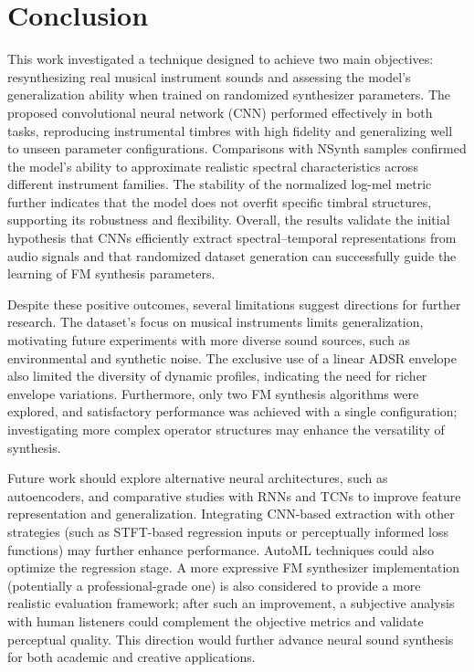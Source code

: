 \documentclass[10pt,conference]{IEEEtran}
\begin{document}
\section{Conclusion} \label{sec:conclusion}

This work investigated a technique designed to achieve two main objectives: resynthesizing real musical instrument sounds and assessing the model's generalization ability when trained on randomized synthesizer parameters. The proposed convolutional neural network (CNN) performed effectively in both tasks, reproducing instrumental timbres with high fidelity and generalizing well to unseen parameter configurations. Comparisons with NSynth samples confirmed the model’s ability to approximate realistic spectral characteristics across different instrument families. The stability of the normalized log-mel metric further indicates that the model does not overfit specific timbral structures, supporting its robustness and flexibility. Overall, the results validate the initial hypothesis that CNNs efficiently extract spectral–temporal representations from audio signals and that randomized dataset generation can successfully guide the learning of FM synthesis parameters.

Despite these positive outcomes, several limitations suggest directions for further research. The dataset’s focus on musical instruments limits generalization, motivating future experiments with more diverse sound sources, such as environmental and synthetic noise. The exclusive use of a linear ADSR envelope also limited the diversity of dynamic profiles, indicating the need for richer envelope variations. Furthermore, only two FM synthesis algorithms were explored, and satisfactory performance was achieved with a single configuration; investigating more complex operator structures may enhance the versatility of synthesis.

Future work should explore alternative neural architectures, such as autoencoders, and comparative studies with RNNs and TCNs to improve feature representation and generalization. Integrating CNN-based extraction with other strategies (such as STFT-based regression inputs or perceptually informed loss functions) may further enhance performance. AutoML techniques could also optimize the regression stage. A more expressive FM synthesizer implementation (potentially a professional-grade one) is also considered to provide a more realistic evaluation framework; after such an improvement, a subjective analysis with human listeners could complement the objective metrics and validate perceptual quality. This direction would further advance neural sound synthesis for both academic and creative applications.

\balance



\end{document}
